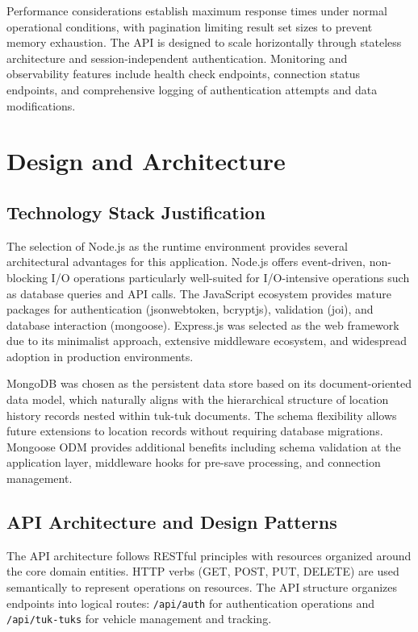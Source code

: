 \documentclass[12pt,a4paper]{article}
\begin{document}
Performance considerations establish maximum response times under normal operational conditions, with pagination limiting result set sizes to prevent memory exhaustion. The API is designed to scale horizontally through stateless architecture and session-independent authentication. Monitoring and observability features include health check endpoints, connection status endpoints, and comprehensive logging of authentication attempts and data modifications.

\section{Design and Architecture}

\subsection{Technology Stack Justification}

The selection of Node.js as the runtime environment provides several architectural advantages for this application. Node.js offers event-driven, non-blocking I/O operations particularly well-suited for I/O-intensive operations such as database queries and API calls. The JavaScript ecosystem provides mature packages for authentication (jsonwebtoken, bcryptjs), validation (joi), and database interaction (mongoose). Express.js was selected as the web framework due to its minimalist approach, extensive middleware ecosystem, and widespread adoption in production environments.

MongoDB was chosen as the persistent data store based on its document-oriented data model, which naturally aligns with the hierarchical structure of location history records nested within tuk-tuk documents. The schema flexibility allows future extensions to location records without requiring database migrations. Mongoose ODM provides additional benefits including schema validation at the application layer, middleware hooks for pre-save processing, and connection management.

\subsection{API Architecture and Design Patterns}

The API architecture follows RESTful principles with resources organized around the core domain entities. HTTP verbs (GET, POST, PUT, DELETE) are used semantically to represent operations on resources. The API structure organizes endpoints into logical routes: \texttt{/api/auth} for authentication operations and \texttt{/api/tuk-tuks} for vehicle management and tracking.
\end{document}
